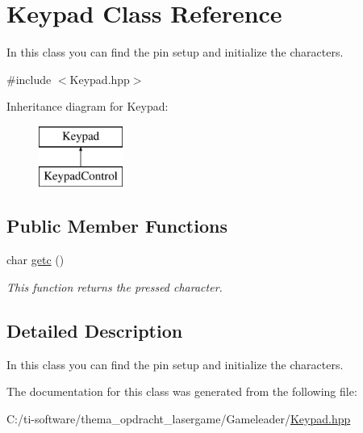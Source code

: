 \hypertarget{class_keypad}{}\section{Keypad Class Reference}
\label{class_keypad}


In this class you can find the pin setup and initialize the characters.  




{\ttfamily \#include $<$Keypad.\+hpp$>$}

Inheritance diagram for Keypad\+:\begin{figure}[H]
\begin{center}
\leavevmode
\includegraphics[height=2.000000cm]{class_keypad}
\end{center}
\end{figure}
\subsection*{Public Member Functions}
\begin{DoxyCompactItemize}
\item 
\mbox{\label{class_keypad_ade2df731c6751f21bbf745b276cb7208}} 
char \mbox{\hyperlink{class_keypad_ade2df731c6751f21bbf745b276cb7208}{getc}} ()
\begin{DoxyCompactList}\small\item\em This function returns the pressed character. \end{DoxyCompactList}\end{DoxyCompactItemize}


\subsection{Detailed Description}
In this class you can find the pin setup and initialize the characters. 

The documentation for this class was generated from the following file\+:\begin{DoxyCompactItemize}
\item 
C\+:/ti-\/software/thema\+\_\+opdracht\+\_\+lasergame/\+Gameleader/\mbox{\hyperlink{_keypad_8hpp}{Keypad.\+hpp}}\end{DoxyCompactItemize}
